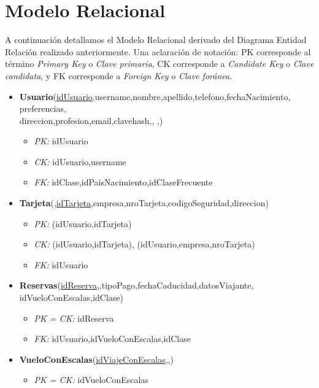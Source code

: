 \section{Modelo Relacional}

A continuaci\'on detallamos el Modelo Relacional derivado del
Diagrama Entidad Relaci\'on realizado anteriormente. Una aclaraci\'on
de notaci\'on: PK corresponde al t\'ermino \textit{Primary Key} o \textit{Clave primaria},
CK corresponde a \textit{Candidate Key} o \textit{Clave candidata}, y FK corresponde a
\textit{Foreign Key} o \textit{Clave for\'anea}.

\begin{itemize}
	\item \textbf{Usuario}(\underline{idUsuario},username,nombre,apellido,telefono,fechaNacimiento,
	preferencias,\\ direccion,profesion,email,clavehash,,
	,)
		\begin{itemize}
			\item \textit{PK:} idUsuario
			\item \textit{CK:} idUsuario,username
			\item \textit{FK:} idClase,idPaisNacimiento,idClaseFrecuente
		\end{itemize}
	\item \textbf{Tarjeta}(\underline{,idTarjeta},empresa,nroTarjeta,codigoSeguridad,direccion)
		\begin{itemize}
			\item \textit{PK:} (idUsuario,idTarjeta)
			\item \textit{CK:} (idUsuario,idTarjeta), (idUsuario,empresa,nroTarjeta)
			\item \textit{FK:} idUsuario
		\end{itemize}
	\item \textbf{Reservas}(\underline{idReserva},,tipoPago,fechaCaducidad,datosViajante,
		idVueloConEscalas,idClase)
		\begin{itemize}
			\item \textit{PK = CK:} idReserva
			\item \textit{FK:} idUsuario,idVueloConEscalas,idClase
		\end{itemize}
	\item \textbf{VueloConEscalas}(\underline{idViajeConEscalas},,)
		\begin{itemize}
			\item \textit{PK = CK:} idVueloConEscalas

\end{itemize}
\end{itemize}
